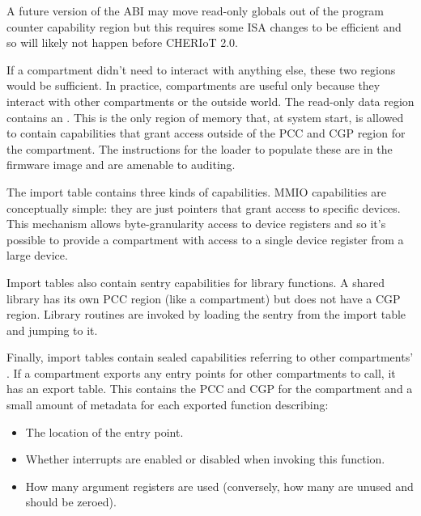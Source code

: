 

\begin{note}
A future version of the ABI may move read-only globals out of the program counter capability region but this requires some ISA changes to be efficient and so will likely not happen before CHERIoT 2.0.
\end{note}

If a compartment didn't need to interact with anything else, these two regions would be sufficient.
In practice, compartments are useful only because they interact with other compartments or the outside world.
The read-only data region contains an .
This is the only region of memory that, at system start, is allowed to contain capabilities that grant access outside of the PCC and CGP region for the compartment.
The instructions for the loader to populate these are in the firmware image and are amenable to auditing.

The import table contains three kinds of capabilities.
MMIO capabilities are conceptually simple: they are just pointers that grant access to specific devices.
This mechanism allows byte-granularity access to device registers and so it's possible to provide a compartment with access to a single device register from a large device.

Import tables also contain sentry capabilities for library functions.
A shared library has its own PCC region (like a compartment) but does not have a CGP region.
Library routines are invoked by loading the sentry from the import table and jumping to it.

Finally, import tables contain sealed capabilities referring to other compartments' .
If a compartment exports any entry points for other compartments to call, it has an export table.
This contains the PCC and CGP for the compartment and a small amount of metadata for each exported function describing:

\begin{itemize}
	\item{The location of the entry point.}
	\item{Whether interrupts are enabled or disabled when invoking this function.}
	\item{How many argument registers are used (conversely, how many are unused and should be zeroed).}
\end{itemize}


